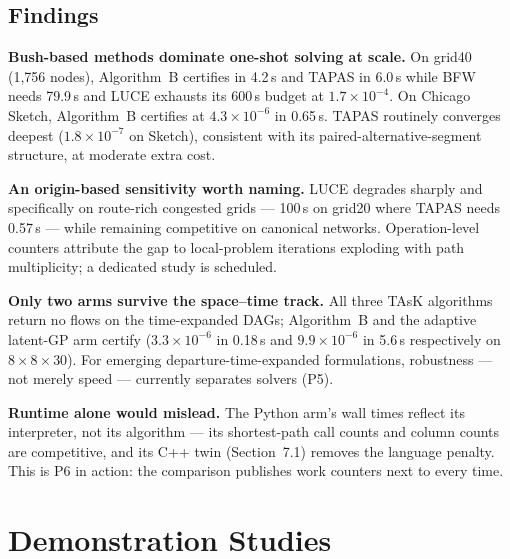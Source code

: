 \documentclass[11pt]{article}
\begin{document}
\subsection{Findings}
\textbf{Bush-based methods dominate one-shot solving at scale.} On grid40
(1{,}756 nodes), Algorithm~B certifies in 4.2\,s and TAPAS in 6.0\,s while
BFW needs 79.9\,s and LUCE exhausts its 600\,s budget at
$1.7\times10^{-4}$. On Chicago Sketch, Algorithm~B certifies at
$4.3\times10^{-6}$ in 0.65\,s. TAPAS routinely converges deepest
($1.8\times10^{-7}$ on Sketch), consistent with its
paired-alternative-segment structure, at moderate extra cost.

\textbf{An origin-based sensitivity worth naming.} LUCE degrades sharply
and specifically on route-rich congested grids --- 100\,s on grid20 where
TAPAS needs 0.57\,s --- while remaining competitive on canonical networks.
Operation-level counters attribute the gap to local-problem iterations
exploding with path multiplicity; a dedicated study is scheduled.

\textbf{Only two arms survive the space--time track.} All three TAsK
algorithms return no flows on the time-expanded DAGs; Algorithm~B and the
adaptive latent-GP arm certify ($3.3\times10^{-6}$ in 0.18\,s and
$9.9\times10^{-6}$ in 5.6\,s respectively on $8{\times}8{\times}30$). For
emerging departure-time-expanded formulations, robustness --- not merely
speed --- currently separates solvers (P5).

\textbf{Runtime alone would mislead.} The Python arm's wall times reflect
its interpreter, not its algorithm --- its shortest-path call counts and
column counts are competitive, and its C++ twin (Section~7.1) removes the
language penalty. This is P6 in action: the comparison publishes work
counters next to every time.

\section{Demonstration Studies}
\end{document}
